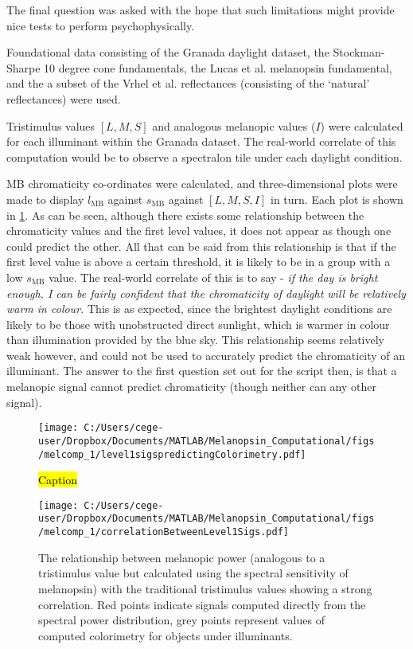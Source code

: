 \documentclass{article}
\begin{document}
The final question was asked with the hope that such limitations might provide nice tests to perform psychophysically. 

Foundational data consisting of the Granada daylight dataset, the Stockman-Sharpe 10 degree cone fundamentals, the Lucas et al. melanopsin fundamental, and the a subset of the Vrhel et al. reflectances (consisting of the `natural' reflectances) were used.

Tristimulus values $[L,M,S]$ and analogous melanopic values ($I$) were calculated for each illuminant within the Granada dataset. The real-world correlate of this computation would be to observe a spectralon tile under each daylight condition.

\ac{MB} chromaticity co-ordinates were calculated, and three-dimensional plots were made to display $l_{\text{MB}}$ against $s_{\text{MB}}$ against $[L,M,S,I]$ in turn. Each plot is shown in \ref{fig:l1}. As can be seen, although there exists some relationship between the chromaticity values and the first level values, it does not appear as though one could predict the other. All that can be said from this relationship is that if the first level value is above a certain threshold, it is likely to be in a group with a low $s_{\text{MB}}$ value. The real-world correlate of this is to say - \textit{if the day is bright enough, I can be fairly confident that the chromaticity of daylight will be relatively warm in colour.} This is as expected, since the brightest daylight conditions are likely to be those with unobstructed direct sunlight, which is warmer in colour than illumination provided by the blue sky. This relationship seems relatively weak however, and could not be used to accurately predict the chromaticity of an illuminant. The answer to the first question set out for the script then, is that a melanopic signal cannot predict chromaticity (though neither can any other signal).

\begin{figure}[h]
    \centering
    \texttt{[image: C:/Users/cege-user/Dropbox/Documents/MATLAB/Melanopsin\_Computational/figs/melcomp\_1/level1sigspredictingColorimetry.pdf]}
    \caption{\hl{Caption}}
    \label{fig:l1}
\end{figure} 

\begin{figure}[h]
    \centering
    \texttt{[image: C:/Users/cege-user/Dropbox/Documents/MATLAB/Melanopsin\_Computational/figs/melcomp\_1/correlationBetweenLevel1Sigs.pdf]}
    \caption{The relationship between melanopic power (analogous to a tristimulus value but calculated using the spectral sensitivity of melanopsin) with the traditional tristimulus values showing a strong correlation. Red points indicate signals computed directly from the spectral power distribution, grey points represent values of computed colorimetry for objects under illuminants.}
    \label{fig:tristimCorrelation}
\end{figure} 
\end{document}
